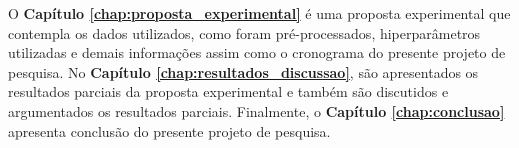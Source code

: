 O \textbf{Capítulo \ref{chap:proposta_experimental}} é uma proposta experimental que contempla os dados utilizados, como foram pré-processados, hiperparâmetros utilizadas e demais informações assim como o cronograma do presente projeto de pesquisa. No \textbf{Capítulo \ref{chap:resultados_discussao}}, são apresentados os resultados parciais da proposta experimental e também são discutidos e argumentados os resultados parciais. Finalmente, o \textbf{Capítulo \ref{chap:conclusao}} apresenta conclusão do presente projeto de pesquisa.

